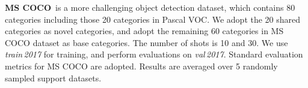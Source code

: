 \documentclass[10pt,twocolumn,letterpaper]{article}
\begin{document}
\smallskip
\textbf{MS COCO\,\cite{MSCOCO}}
is a more challenging object detection dataset, which contains 80 categories including those 20 categories in Pascal VOC. We adopt the 20 shared categories as novel categories, and adopt the remaining 60 categories in MS COCO dataset as base categories. The number of shots is 10 and 30. We use \textit{train\,2017} for training, and perform evaluations on \textit{val\,2017}. Standard evaluation metrics for MS COCO are adopted. Results are averaged over 5 randomly sampled support datasets.




\begin{table}
\begin{center}
\end{center}
\end{table}
\end{document}
